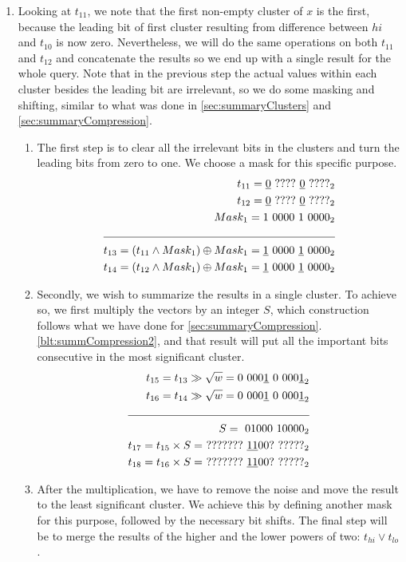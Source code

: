 \begin{enumerate}
    \item \label{blt:parallel4}
    Looking at $t_{11}$, we note that the first non-empty cluster of $x$ is the first, because the leading bit of first cluster resulting from difference between $hi$ and $t_{10}$ is now zero. Nevertheless,  we will do the same operations on both $t_{11}$ and $t_{12}$ and concatenate the results so we end up with a single result for the whole query. Note that in the previous step the actual values within each cluster besides the leading bit are irrelevant, so we do some masking and shifting, similar to what was done in \ref{sec:summaryClusters} and \ref{sec:summaryCompression}.
    \begin{enumerate}
        \item
        The first step is to clear all the irrelevant bits in the clusters and turn the leading bits from zero to one. We choose a mask for this specific purpose.
        \begin{align*}
            t_{11} = \underline{0}\ ????\ \underline{0}\ ????_2&\\
            t_{12} = \underline{0}\ ????\ \underline{0}\ ????_2&\\
            Mask_1 = 1\ 0000\ 1\ 0000_2&\\ \cline{1-2}
            t_{13} = (t_{11} \wedge Mask_1) \oplus Mask_1 = \underline{1}\ 0000\ \underline{1}\ 0000_2&\\
            t_{14} = (t_{12} \wedge Mask_1) \oplus Mask_1 = \underline{1}\ 0000\ \underline{1}\ 0000_2&
        \end{align*}
        \item
        Secondly, we wish to summarize the results in a single cluster. To achieve so, we first multiply the vectors by an integer $S$, which construction follows what we have done for \ref{sec:summaryCompression}.\ref{blt:summCompression2}, and that result will put all the important bits consecutive in the most significant cluster.
        \begin{align*}
            t_{15} = t_{13} \gg \sqrt{w} = 0\ 000\underline{1}\ 0\ 000\underline{1}_2& \\
            t_{16} = t_{14} \gg \sqrt{w} = 0\ 000\underline{1}\ 0\ 000\underline{1}_2& \\
            \cline{1-2}
            S =\ 01000\ 10000_2 & \\
            t_{17} = t_{15} \times S =\ ???????\ \underline{11}00?\ ?????_2& \\
            t_{18} = t_{16} \times S =\ ???????\ \underline{11}00?\ ?????_2& \\
        \end{align*}
        \item
        After the multiplication, we have to remove the noise and move the result to the least significant cluster. We achieve this by defining another mask for this purpose, followed by the necessary bit shifts. The final step will be to merge the results of the higher and the lower powers of two: $t_{hi} \vee t_{lo}$.
        

\end{enumerate}
\end{enumerate}
